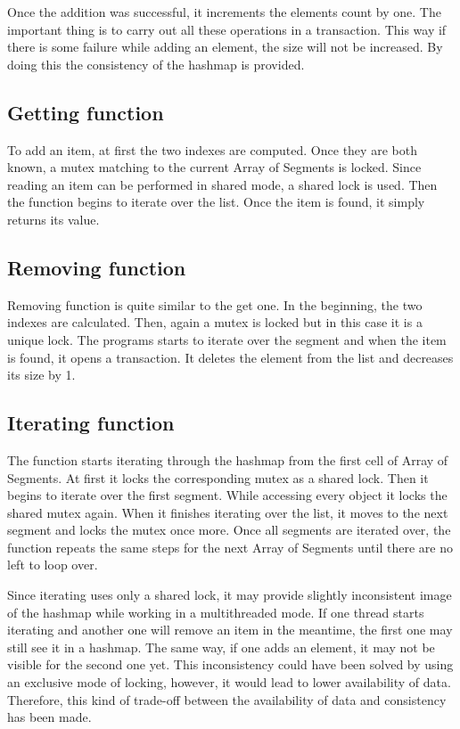     Once the addition was successful, it increments the elements count by one. The important thing is to carry out all these operations in a transaction. This way if there is some failure while adding an element, the size will not be increased. By doing this the consistency of the hashmap is provided.
    
\subsection{Getting function}
    To add an item, at first the two indexes are computed. Once they are both known, a mutex matching to the current Array of Segments is locked. Since reading an item can be performed in shared mode, a shared lock is used. Then the function begins to iterate over the list. Once the item is found, it simply returns its value.

\subsection{Removing function}
    Removing function is quite similar to the get one. In the beginning, the two indexes are calculated. Then, again a mutex is locked but in this case it is a unique lock. The programs starts to iterate over the segment and when the item is found, it opens a transaction. It deletes the element from the list and decreases its size by 1.
    
        
\subsection{Iterating function}
    The function starts iterating through the hashmap from the first cell of Array of Segments. At first it locks the corresponding mutex as a shared lock. Then it begins to iterate over the first segment. While accessing every object it locks the shared mutex again. When it finishes iterating over the list, it moves to the next segment and locks the mutex once more. Once all segments are iterated over, the function repeats the same steps for the next Array of Segments until there are no left to loop over.
    
    Since iterating uses only a shared lock, it may provide slightly inconsistent image of the hashmap while working in a multithreaded mode. If one thread starts iterating and another one will remove an item in the meantime, the first one may still see it in a hashmap. The same way, if one adds an element, it may not be visible for the second one yet. This inconsistency could have been solved by using an exclusive mode of locking, however, it would lead to lower availability of data. Therefore, this kind of trade-off between the availability of data and consistency has been made.
    
